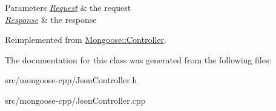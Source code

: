 \begin{DoxyParams}{Parameters}
{\em \hyperlink{classMongoose_1_1Request}{Request}} & the request \\
\hline
{\em \hyperlink{classMongoose_1_1Response}{Response}} & the response \\
\hline
\end{DoxyParams}


Reimplemented from \hyperlink{classMongoose_1_1Controller_a3eff704e4a3b4dc5a63fbfaa50a934ff}{Mongoose\+::\+Controller}.



The documentation for this class was generated from the following files\+:\begin{DoxyCompactItemize}
\item 
src/mongoose-\/cpp/Json\+Controller.\+h\item 
src/mongoose-\/cpp/Json\+Controller.\+cpp\end{DoxyCompactItemize}
